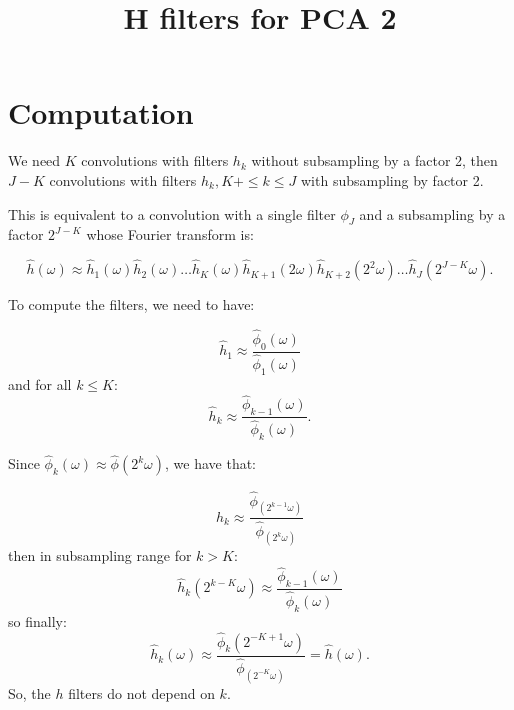 \documentclass[a4page]{article}
\title{H filters for PCA 2}
\begin{document}
	\maketitle
	\section{Computation}
	
	We need $K$ convolutions with filters $h_k$ without subsampling by a factor 2, then
	$J-K$ convolutions with filters $h_k, K+\leq k \leq J$ with subsampling by factor 2.
	
	This is equivalent to a convolution with a single filter $\phi_J$ and a subsampling by a
	factor $2^{J-K}$ whose Fourier transform is:
	
	\begin{equation}
		\hat{h}(\omega) \approx \hat{h}_1(\omega) \hat{h}_2(\omega) \ldots \hat{h}_K(\omega) \hat{h}_{K+1}(2 \omega) \hat{h}_{K+2}(2^2 \omega) \ldots \hat{h}_J (2^{J-K} \omega).
	\end{equation}

To compute the filters, we need to have: 

\begin{equation}
	\hat{h}_1 \approx \frac{\hat{\phi}_0(\omega)}{\hat{\phi}_1(\omega)}
\end{equation}
and for all $k \leq K$:
\begin{equation}
\hat{h}_k \approx \frac{\hat{\phi}_{k-1}(\omega)}{\hat{\phi}_k(\omega)}.
\end{equation}

Since $\hat{\phi}_k(\omega) \approx \hat{\phi}(2^k \omega)$, we have that:

\begin{equation}
	\hat{h}_k \approx \frac{\hat{\phi}_(2^{k-1}\omega)}{\hat{\phi}_(2^k \omega)}
\end{equation}
then in subsampling range for $k > K$:
\begin{equation}
\hat{h}_k (2^{k-K} \omega) \approx \frac{\hat{\phi}_{k-1}(\omega)}{\hat{\phi}_{k} (\omega)}
\end{equation}
so finally:
\begin{equation}
\hat{h}_k (\omega) \approx \frac{\hat{\phi}_k(2^{-K+1}\omega)}{\hat{\phi}_(2^{-K} \omega)} = \hat{h}(\omega).
\end{equation}
So, the $h$ filters do not depend on $k$.
\end{document}
